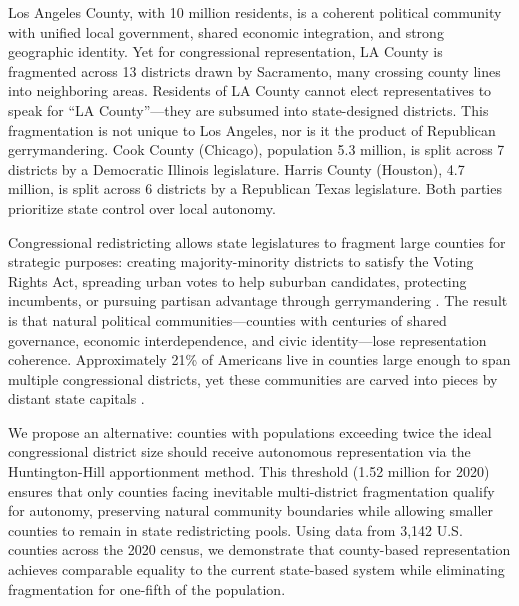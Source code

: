 Los Angeles County, with 10 million residents, is a coherent political community with unified local government, shared economic integration, and strong geographic identity. Yet for congressional representation, LA County is fragmented across 13 districts drawn by Sacramento, many crossing county lines into neighboring areas. Residents of LA County cannot elect representatives to speak for ``LA County''---they are subsumed into state-designed districts. This fragmentation is not unique to Los Angeles, nor is it the product of Republican gerrymandering. Cook County (Chicago), population 5.3 million, is split across 7 districts by a Democratic Illinois legislature. Harris County (Houston), 4.7 million, is split across 6 districts by a Republican Texas legislature. Both parties prioritize state control over local autonomy.

Congressional redistricting allows state legislatures to fragment large counties for strategic purposes: creating majority-minority districts to satisfy the Voting Rights Act, spreading urban votes to help suburban candidates, protecting incumbents, or pursuing partisan advantage through gerrymandering \citep{cox2016efficient, chen2013unintentional}. The result is that natural political communities---counties with centuries of shared governance, economic interdependence, and civic identity---lose representation coherence. Approximately 21\% of Americans live in counties large enough to span multiple congressional districts, yet these communities are carved into pieces by distant state capitals \citep{putnam2000bowling}.

We propose an alternative: counties with populations exceeding twice the ideal congressional district size should receive autonomous representation via the Huntington-Hill apportionment method. This threshold (1.52 million for 2020) ensures that only counties facing inevitable multi-district fragmentation qualify for autonomy, preserving natural community boundaries while allowing smaller counties to remain in state redistricting pools. Using data from 3,142 U.S. counties across the 2020 census, we demonstrate that county-based representation achieves comparable equality to the current state-based system while eliminating fragmentation for one-fifth of the population.

